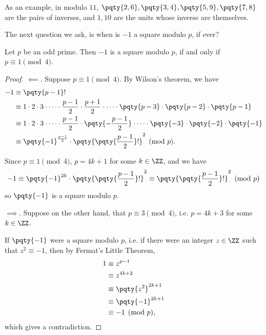As an example, in modulo \(11\), \(\pqty{2, 6}, \pqty{3, 4}, \pqty{5, 9}, \pqty{7, 8}\) are the pairs of inverses, and \(1, 10\) are the units whose inverse are themselves.

The next question we ask, is when is \(-1\) a square modulo \(p\), if ever?

\begin{proposition}
    Let \(p\) be an odd prime. Then \(-1\) is a square modulo \(p\), if and only if \(p \equiv 1 \pmod{4}\).
\end{proposition}

\begin{proof}
    \(\impliedby\). Suppose \(p \equiv 1 \pmod{4}\). By Wilson's theorem, we have
    \begin{align*}
        -1 &\equiv \pqty{p - 1}! \\
        &\equiv 1 \cdot 2 \cdot 3 \cdot \cdots \cdot \frac{p - 1}{2} \cdot \frac{p + 1}{2} \cdot \cdots \cdot \pqty{p - 3} \cdot \pqty{p - 2} \cdot \pqty{p - 1} \\
        &\equiv 1 \cdot 2 \cdot 3 \cdot \cdots \cdot \frac{p - 1}{2} \cdot \pqty{- \frac{p - 1}{2}} \cdot \cdots \cdot \pqty{-3} \cdot \pqty{-2} \cdot \pqty{-1} \\
        &\equiv \pqty{-1}^{\frac{p - 1}{2}} \cdot \pqty{\pqty{\frac{p - 1}{2}}!}^2 \pmod{p}.
    \end{align*}

    Since \(p \equiv 1 \pmod{4}\), \(p = 4k + 1\) for some \(k \in \ZZ\), and we have
    \[
        -1 \equiv \pqty{-1}^{2k} \cdot \pqty{\pqty{\frac{p - 1}{2}}!}^2 \equiv \pqty{\pqty{\frac{p - 1}{2}}!}^2 \pmod{p}
    \]
    so \(\pqty{-1}\) is a square modulo \(p\).

    \(\implies\). Suppose on the other hand, that \(p \equiv 3 \pmod{4}\), i.e. \(p = 4k + 3\) for some \(k \in \ZZ\).

    If \(\pqty{-1}\) were a square modulo \(p\), i.e. if there were an integer \(z \in \ZZ\) such that \(z^2 \equiv -1\), then by Fermat's Little Theorem,
    \begin{align*}
        1 &\equiv z^{p - 1} \\
        &\equiv z^{4k + 2} \\
        &\equiv \pqty{z^2}^{2k + 1} \\
        &\equiv \pqty{-1}^{2k + 1} \\
        &\equiv -1 \pmod{p},
    \end{align*}
    which gives a contradiction.
\end{proof}


